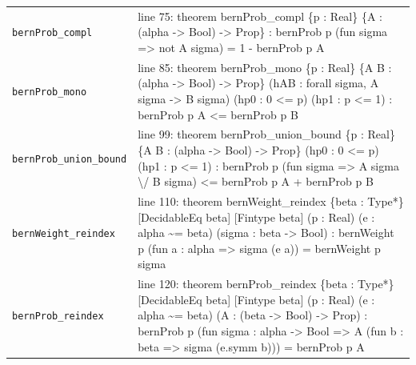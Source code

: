 \documentclass[10pt]{article}
\begin{document}
\begin{longtable}{>{\raggedright\arraybackslash}p{} >{\raggedright\arraybackslash}p{}}
\texttt{bernProb\_\allowbreak{}compl} & {\ttfamily\scriptsize line 75:\allowbreak{} theorem bernProb\_\allowbreak{}compl \{p :\allowbreak{} Real\} \{A :\allowbreak{} (\allowbreak{}alpha -\allowbreak{}> Bool)\allowbreak{} -\allowbreak{}> Prop\} :\allowbreak{} bernProb p (\allowbreak{}fun sigma =\allowbreak{}> not A sigma)\allowbreak{} =\allowbreak{} 1 -\allowbreak{} bernProb p A} \\[0.45em]
\texttt{bernProb\_\allowbreak{}mono} & {\ttfamily\scriptsize line 85:\allowbreak{} theorem bernProb\_\allowbreak{}mono \{p :\allowbreak{} Real\} \{A B :\allowbreak{} (\allowbreak{}alpha -\allowbreak{}> Bool)\allowbreak{} -\allowbreak{}> Prop\} (\allowbreak{}hAB :\allowbreak{} forall sigma,\allowbreak{} A sigma -\allowbreak{}> B sigma)\allowbreak{} (\allowbreak{}hp0 :\allowbreak{} 0 <=\allowbreak{} p)\allowbreak{} (\allowbreak{}hp1 :\allowbreak{} p <=\allowbreak{} 1)\allowbreak{} :\allowbreak{} bernProb p A <=\allowbreak{} bernProb p B} \\[0.45em]
\texttt{bernProb\_\allowbreak{}union\_\allowbreak{}bound} & {\ttfamily\scriptsize line 99:\allowbreak{} theorem bernProb\_\allowbreak{}union\_\allowbreak{}bound \{p :\allowbreak{} Real\} \{A B :\allowbreak{} (\allowbreak{}alpha -\allowbreak{}> Bool)\allowbreak{} -\allowbreak{}> Prop\} (\allowbreak{}hp0 :\allowbreak{} 0 <=\allowbreak{} p)\allowbreak{} (\allowbreak{}hp1 :\allowbreak{} p <=\allowbreak{} 1)\allowbreak{} :\allowbreak{} bernProb p (\allowbreak{}fun sigma =\allowbreak{}> A sigma \textbackslash{}/\allowbreak{} B sigma)\allowbreak{} <=\allowbreak{} bernProb p A +\allowbreak{} bernProb p B} \\[0.45em]
\texttt{bernWeight\_\allowbreak{}reindex} & {\ttfamily\scriptsize line 110:\allowbreak{} theorem bernWeight\_\allowbreak{}reindex \{beta :\allowbreak{} Type*\allowbreak{}\} [DecidableEq beta] [Fintype beta] (\allowbreak{}p :\allowbreak{} Real)\allowbreak{} (\allowbreak{}e :\allowbreak{} alpha \textasciitilde{}=\allowbreak{} beta)\allowbreak{} (\allowbreak{}sigma :\allowbreak{} beta -\allowbreak{}> Bool)\allowbreak{} :\allowbreak{} bernWeight p (\allowbreak{}fun a :\allowbreak{} alpha =\allowbreak{}> sigma (\allowbreak{}e a)\allowbreak{})\allowbreak{} =\allowbreak{} bernWeight p sigma} \\[0.45em]
\texttt{bernProb\_\allowbreak{}reindex} & {\ttfamily\scriptsize line 120:\allowbreak{} theorem bernProb\_\allowbreak{}reindex \{beta :\allowbreak{} Type*\allowbreak{}\} [DecidableEq beta] [Fintype beta] (\allowbreak{}p :\allowbreak{} Real)\allowbreak{} (\allowbreak{}e :\allowbreak{} alpha \textasciitilde{}=\allowbreak{} beta)\allowbreak{} (\allowbreak{}A :\allowbreak{} (\allowbreak{}beta -\allowbreak{}> Bool)\allowbreak{} -\allowbreak{}> Prop)\allowbreak{} :\allowbreak{} bernProb p (\allowbreak{}fun sigma :\allowbreak{} alpha -\allowbreak{}> Bool =\allowbreak{}> A (\allowbreak{}fun b :\allowbreak{} beta =\allowbreak{}> sigma (\allowbreak{}e.\allowbreak{}symm b)\allowbreak{})\allowbreak{})\allowbreak{} =\allowbreak{} bernProb p A} \\[0.45em]

\end{longtable}
\end{document}
